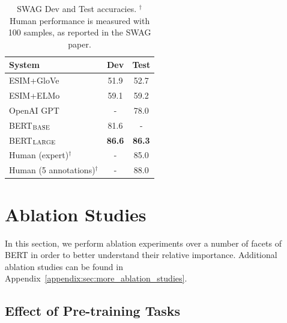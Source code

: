 \documentclass[11pt,a4paper]{article}
\newcommand\bertbase{BERT$_{\small \textsc{BASE}}$\xspace}
\newcommand\bertlarge{BERT$_{\small \textsc{LARGE}}$\xspace}
\begin{document}
\begin{table}[tb]
\begin{center}
{
\small
 \begin{tabular}{lcc}
    \toprule
System             &  Dev    & Test\\ 
\midrule
ESIM+GloVe   & 51.9       & 52.7 \\
ESIM+ELMo    & 59.1       & 59.2 \\
OpenAI GPT    & -       & 78.0 \\
\midrule
\bertbase    & 81.6       &  - \\
\bertlarge   & {\bf 86.6} & {\bf 86.3} \\
\midrule
Human (expert)$^\dagger$ & - & 85.0 \\
Human (5 annotations)$^\dagger$        & -          & 88.0 \\
\bottomrule
\end{tabular}
}
\caption{SWAG Dev and Test accuracies. 
$^\dagger$Human performance is measured with 100 samples, as reported in the SWAG paper.}
\label{tab:swag_official}
\end{center}
\end{table}


\section{Ablation Studies}
\label{sec:ablation}
In this section, we perform ablation experiments over a number of facets of BERT in order to better understand their relative importance. Additional ablation studies can be found in Appendix~\ref{appendix:sec:more_ablation_studies}.

\subsection{Effect of Pre-training Tasks}
\end{document}
